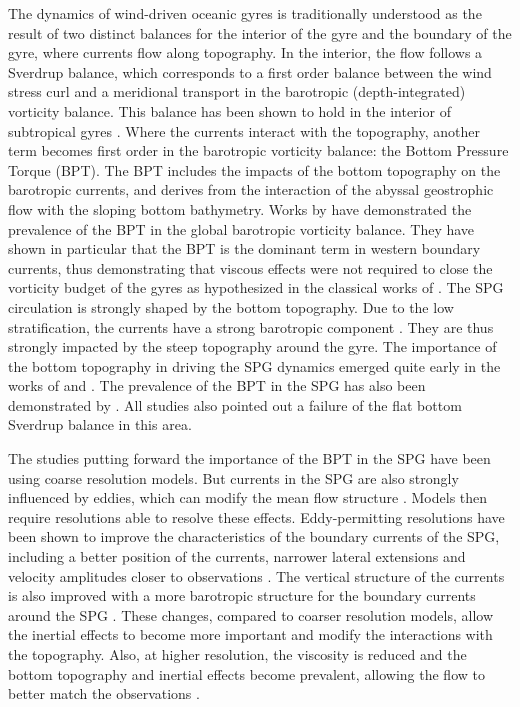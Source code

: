 \documentclass{ametsoc}
\begin{document}
 The dynamics of wind-driven oceanic gyres is traditionally understood as the result of two distinct balances for the interior of the gyre and the boundary of the gyre, where currents flow along topography. In the interior, the flow follows a Sverdrup balance, which corresponds to a first order balance between the wind stress curl and a meridional transport in the barotropic (depth-integrated) vorticity balance. This balance has been shown to hold in the interior of subtropical gyres \citep{hughes2001, TDBAJS14, yeager2015, schoonover2016, sonnewald2019, LBST19}. Where the currents interact with the topography, another term becomes first order in the barotropic vorticity balance: the Bottom Pressure Torque (BPT). The BPT includes the impacts of the bottom topography on the barotropic currents, and derives from the interaction of the abyssal geostrophic flow with the sloping bottom bathymetry. Works by \citet{hughes2000,hughes2001, jackson2006, schoonover2016} have demonstrated the prevalence of the BPT in the global barotropic vorticity balance. They have shown in particular that the BPT is the dominant term in western boundary currents, thus demonstrating that viscous effects were not required to close the vorticity budget of the gyres as hypothesized in the classical works of \citet{Munk1950}. 
 The SPG circulation is strongly shaped by the bottom topography. Due to the low stratification, the currents have a strong barotropic component \citep{vanaken1995,daniault2016,fischer2004}.  They are thus strongly impacted by the steep topography around the gyre. The importance of the bottom topography in driving the SPG dynamics emerged quite early in the works of \citet{luyten1985} and \citet{wunsch1985}. The prevalence of the BPT in the SPG has also been demonstrated by \citet{hughes2001, spence2012, yeager2015}. All studies also pointed out a failure of the flat bottom Sverdrup balance in this area. 

The studies putting forward the importance of the BPT in the SPG have been using coarse resolution models. But currents in the SPG are also strongly influenced by eddies, which can modify the mean flow structure \citep{MW08}. Models then require resolutions able to resolve these effects. Eddy-permitting resolutions have been shown to improve the characteristics of the boundary currents of the SPG, including a better position of the currents, narrower lateral extensions and velocity amplitudes closer to observations \citep{treguier2005,danek2019}. The vertical structure of the currents is also improved with a more barotropic structure for the boundary currents around the SPG \citep{marzocchi2015}. These changes, compared to coarser resolution models, allow the inertial effects to become more important and modify the interactions with the topography. Also, at higher resolution, the viscosity is reduced and the bottom topography and inertial effects become prevalent, allowing the flow to better match the observations \citep{spence2012, schoonover2016}. 
\end{document}
